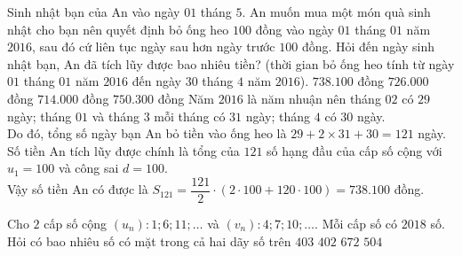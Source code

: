\begin{ex}%
	Sinh nhật bạn của An vào ngày $01$ tháng $5$. An muốn mua một món quà sinh nhật cho bạn nên quyết định bỏ ống heo $100$ đồng vào ngày $01$ tháng $01$ năm $2016$, sau đó cứ liên tục ngày sau hơn ngày trước $100$ đồng. Hỏi đến ngày sinh nhật bạn, An đã tích lũy được bao nhiêu tiền? (thời gian bỏ ống heo tính từ ngày $01$ tháng $01$ năm $2016$ đến ngày $30$ tháng $4$ năm $2016$).
	\choice
	{\True $738.100$ đồng}
	{$726.000$ đồng}
	{$714.000$ đồng}
	{$750.300$ đồng}
	\loigiai
	{Năm $2016$ là năm nhuận nên tháng $02$ có $29$ ngày; tháng $01$ và tháng $3$ mỗi tháng có $31$ ngày; tháng $4$ có $30$ ngày.\\
	Do đó, tổng số ngày bạn An bỏ tiền vào ống heo là $29+2\times 31+30=121$ ngày. 
	Số tiền An tích lũy được chính là tổng của $121$ số hạng đầu của cấp số cộng với $u_1=100$ và công sai $d=100$.\\
	Vậy số tiền An có được là $S_{121}=\dfrac{121}{2}\cdot (2\cdot 100+120\cdot 100)=738.100$ đồng.
	}
\end{ex}%
\begin{ex}%
Cho $2$ cấp số cộng $(u_n) \colon 1;6;11; \ldots$ và $(v_n) \colon 4;7;10; \ldots$. Mỗi cấp số có $2018$ số. Hỏi có bao nhiêu số có mặt trong cả hai dãy số trên
\choice
{\True $403$}
{$402$}
{$672$}
{$504$}
\end{ex}%
